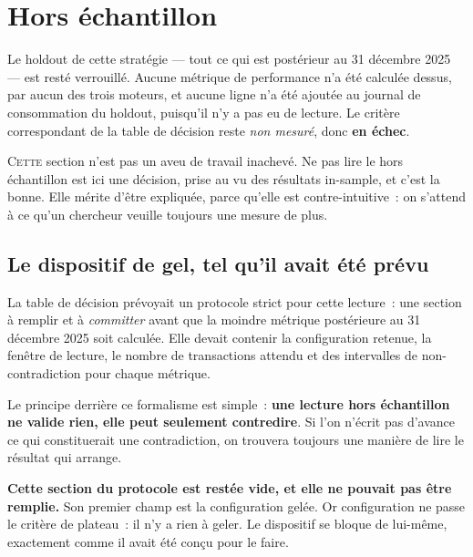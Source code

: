 \section{Hors échantillon}
\label{sec:x10_hors_echantillon}

\begin{warningbox}[title=\textbf{\color{white}\textsf{La tranche 2026 n'a pas été lue}}]
Le holdout de cette stratégie --- tout ce qui est postérieur au 31 décembre
2025 --- est resté verrouillé. Aucune métrique de performance n'a été calculée
dessus, par aucun des trois moteurs, et aucune ligne n'a été ajoutée au
journal de consommation du holdout, puisqu'il n'y a pas eu de lecture. Le
critère correspondant de la table de décision reste \emph{non mesuré}, donc
\textbf{en échec}.
\end{warningbox}

\lettrine[lines=2, findent=2pt, nindent=0pt]{C}{ette} section n'est pas un
aveu de travail inachevé. Ne pas lire le hors échantillon est ici une
décision, prise au vu des résultats in-sample, et c'est la bonne. Elle mérite
d'être expliquée, parce qu'elle est contre-intuitive~: on s'attend à ce qu'un
chercheur veuille toujours une mesure de plus.

\subsection{Le dispositif de gel, tel qu'il avait été prévu}

La table de décision prévoyait un protocole strict pour cette lecture~: une
section à remplir et à \emph{committer} avant que la moindre métrique
postérieure au 31 décembre 2025 soit calculée. Elle devait contenir la
configuration retenue, la fenêtre de lecture, le nombre de transactions
attendu et des intervalles de non-contradiction pour chaque métrique.

Le principe derrière ce formalisme est simple~: \textbf{une lecture hors
échantillon ne valide rien, elle peut seulement contredire}. Si l'on n'écrit
pas d'avance ce qui constituerait une contradiction, on trouvera toujours une
manière de lire le résultat qui arrange.

\begin{insightbox}
\textbf{Cette section du protocole est restée vide, et elle ne pouvait pas
être remplie.} Son premier champ est la configuration gelée. Or
\XTenPlateauPassing{} configuration ne passe le critère de plateau~: il n'y a
rien à geler. Le dispositif se bloque de lui-même, exactement comme il avait
été conçu pour le faire.
\end{insightbox}


